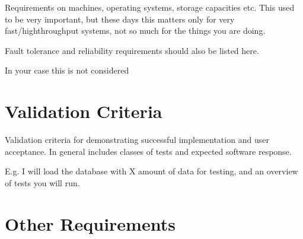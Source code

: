 \documentclass[a4wide]{article}
\begin{document}
Requirements on machines, operating systems, storage capacities etc.
This used to be very important, but these days this matters only
for very fast/highthroughput systems, not so much for the things you
are doing.

Fault tolerance and reliability requirements should also be listed here.

In your case this is not considered


\section{Validation Criteria}

Validation criteria for demonstrating
successful implementation and user acceptance.
In general includes classes of tests and expected software response.

E.g. I will load the database with X amount of data for testing,
and an overview of tests you will run.


\section{Other Requirements}
\end{document}
